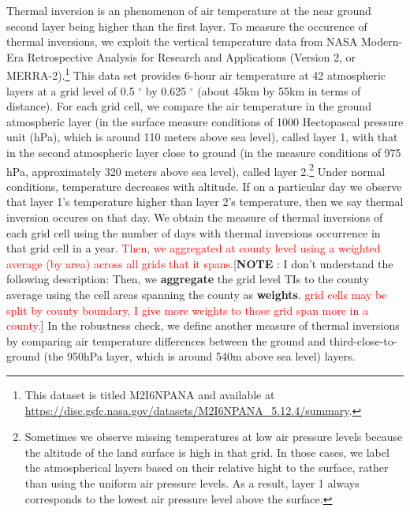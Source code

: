 \documentclass[12pt]{article}
\providecommand{\U}[1]{\protect\rule{.1in}{.1in}}
\begin{document}
\label{sec:data_TI} Thermal inversion is an phenomenon of air temperature at
the near ground second layer being higher than the first layer. To measure
the occurence of thermal inversions, we exploit the vertical temperature
data from NASA Modern-Era Retrospective Analysis for Research and
Applications (Version 2, or MERRA-2).\footnote{%
This dataset is titled M2I6NPANA and available at %
\url{https://disc.gsfc.nasa.gov/datasets/M2I6NPANA_5.12.4/summary}.} This
data set provides 6-hour air temperature at 42 atmospheric layers at a grid
level of 0.5 
${{}^\circ}$
by 0.625 
${{}^\circ}$
(about 45km by 55km in terms of distance). For each grid cell, we compare
the air temperature in the ground atmospheric layer (in the surface measure
conditions of 1000 Hectopascal pressure unit (hPa), which is around 110
meters above sea level), called layer 1, with that in the second atmospheric
layer close to ground (in the measure conditions of 975 hPa, approximately
320 meters above sea level), called layer 2.\footnote{%
Sometimes we observe missing temperatures at low air pressure levels because
the altitude of the land surface is high in that grid. In those cases, we
label the atmospherical layers based on their relative hight to the surface,
rather than using the uniform air pressure levels. As a result, layer 1
always corresponds to the lowest air pressure level above the surface.}
Under normal conditions, temperature decreases with altitude. If on a
particular day we observe that layer 1's temperature higher than layer 2's
temperature, then we say thermal inversion occures on that day. We obtain
the measure of thermal inversions of each grid cell using the number of days
with thermal inversions occurrence in that grid cell in a year. \textcolor{red}{Then, we aggregated at county level
using a weighted average (by area) across all grids that it spans.}[\textbf{NOTE%
}: I don't understand the following description: Then, we \textbf{aggregate}
the grid level TIs to the county average using the cell areas spanning the
county as \textbf{weights}. \textcolor{red}{grid cells may be split by county boundary, I give more weights to those grid span more in a county.}] In the robustness check, we define another
measure of thermal inversions by comparing air temperature differences
between the ground and third-close-to-ground (the 950hPa layer, which is
around 540m above sea level) layers.
\end{document}

